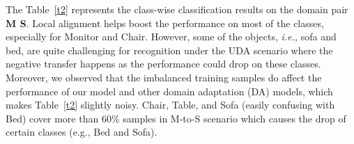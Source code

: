 \documentclass{article}
\begin{document}
The Table~\ref{t2} represents the class-wise classification results on the domain pair \textbf{M  S}. Local alignment helps boost the performance on most of the classes, especially for Monitor and Chair.  However, some of the objects, \textit{i.e.,} sofa and bed, are quite challenging for recognition under the UDA scenario where the negative transfer happens as the performance could drop on these classes. Moreover, we observed that the imbalanced training samples do affect the performance of our model and other domain adaptation (DA) models, which makes Table~\ref{t2} slightly noisy. Chair, Table, and Sofa (easily confusing with Bed) cover more than 60\% samples in M-to-S scenario which causes the drop of certain classes (e.g., Bed and Sofa). 

\begin{table*}[t]
\caption{Class-wise classification results (\%) on ModelNet to ShapeNet. }\label{t2}
\end{table*}
\end{document}
